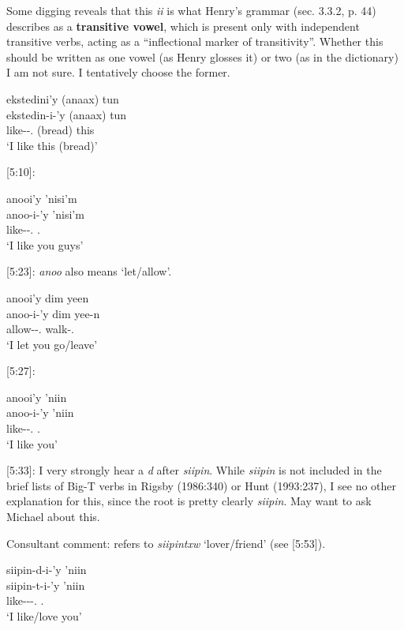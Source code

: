 \documentclass{article}
\newcommand{\tsb}{\textsubbar} %
\begin{document}
Some digging reveals that this \textit{ii} is what Henry's grammar (sec. 3.3.2, p. 44) describes as a \textbf{transitive vowel}, which is present only with independent transitive verbs, acting as a ``inflectional marker of transitivity''. Whether this should be written as one vowel (as Henry glosses it) or two (as in the dictionary) I am not sure. I tentatively choose the former.
\begin{exe}
    \ex \glll ekstedini'y (anaax) tun \\
    ekstedin-i-'y (anaax) tun \\
    like-\Tr{}-\Fsg.\Ii{} (bread) this \\
    `I like this (bread)'
\end{exe}

[5:10]:

\begin{exe}
    \ex \glll anoo\tsb{g}i'y 'nisi'm \\
    anoo\tsb{k}-i-'y 'nisi'm\\
    like-\Tr{}-\Fsg.\Ii{} \Spl{}.\Iii{} \\
    `I like you guys'
\end{exe}

[5:23]: \textit{anoo\tsb{k}} also means `let/allow'.
\begin{exe}
    \ex \glll anoo\tsb{g}i'y dim yeen \\
    anoo\tsb{k}-i-'y dim yee-n\\
    allow-\Tr{}-\Fsg.\Ii{} \Prosp{} walk-\Ssg{}.\Ii{} \\
    `I let you go/leave'
\end{exe}

[5:27]: 
\begin{exe}
    \ex \glll anoo\tsb{g}i'y 'niin \\
    anoo\tsb{k}-i-'y 'niin \\
    like-\Tr{}-\Fsg.\Ii{} \Ssg{}.\Iii{} \\
    `I like you'
\end{exe}

[5:33]: I very strongly hear a \textit{d} after \textit{siipin}. While \textit{siipin} is not included in the brief lists of Big-T verbs in Rigsby (1986:340) or Hunt (1993:237), I see no other explanation for this, since the root is pretty clearly \textit{siipin}. May want to ask Michael about this.

Consultant comment: refers to \textit{siipintxw} `lover/friend' (see [5:53]).
\begin{exe}
    \ex \glll siipin-d-i-'y 'niin \\
    siipin-t-i-'y 'niin \\
    like-\T{}-\Tr{}-\Fsg.\Ii{} \Ssg{}.\Iii{} \\
    `I like/love you'
\end{exe}
\end{document}
